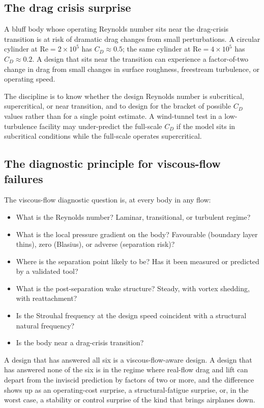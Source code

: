 \subsection{The drag crisis surprise}

A bluff body whose operating Reynolds number sits near the
drag-crisis transition is at risk of dramatic drag changes from
small perturbations. A circular cylinder at $\text{Re} = 2\times
10^5$ has $C_D \approx 0.5$; the same cylinder at $\text{Re} =
4\times 10^5$ has $C_D \approx 0.2$. A design that sits near the
transition can experience a factor-of-two change in drag from
small changes in surface roughness, freestream turbulence, or
operating speed.

The discipline is to know whether the design Reynolds number is
subcritical, supercritical, or near transition, and to design for
the bracket of possible $C_D$ values rather than for a single
point estimate. A wind-tunnel test in a low-turbulence facility
may under-predict the full-scale $C_D$ if the model sits in
subcritical conditions while the full-scale operates supercritical.

\subsection{The diagnostic principle for viscous-flow failures}

The viscous-flow diagnostic question is, at every body in any
flow:

\begin{itemize}[leftmargin=*]
  \item What is the Reynolds number? Laminar, transitional, or
    turbulent regime?
  \item What is the local pressure gradient on the body? Favourable
    (boundary layer thins), zero (Blasius), or adverse (separation
    risk)?
  \item Where is the separation point likely to be? Has it been
    measured or predicted by a validated tool?
  \item What is the post-separation wake structure? Steady, with
    vortex shedding, with reattachment?
  \item Is the Strouhal frequency at the design speed coincident
    with a structural natural frequency?
  \item Is the body near a drag-crisis transition?
\end{itemize}

A design that has answered all six is a viscous-flow-aware design.
A design that has answered none of the six is in the regime where
real-flow drag and lift can depart from the inviscid prediction by
factors of two or more, and the difference shows up as an
operating-cost surprise, a structural-fatigue surprise, or, in the
worst case, a stability or control surprise of the kind that
brings airplanes down.

